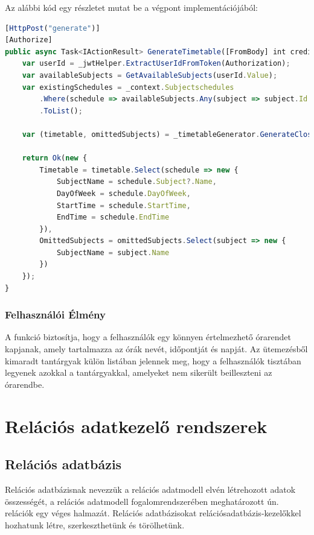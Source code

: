 \documentclass[colorlinks]{thesis-kando}
\theoremstyle{definition}
\theoremstyle{remark}
\begin{document}
Az alábbi kód egy részletet mutat be a végpont implementációjából:

\begin{lstlisting}[language=JavaScript]
[HttpPost("generate")]
[Authorize]
public async Task<IActionResult> GenerateTimetable([FromBody] int creditValue, [FromHeader(Name = "Authorization")] string Authorization) {
    var userId = _jwtHelper.ExtractUserIdFromToken(Authorization);
    var availableSubjects = GetAvailableSubjects(userId.Value);
    var existingSchedules = _context.Subjectschedules
        .Where(schedule => availableSubjects.Any(subject => subject.Id == schedule.SubjectId))
        .ToList();

    var (timetable, omittedSubjects) = _timetableGenerator.GenerateClosestTimetable(creditValue, availableSubjects, existingSchedules);

    return Ok(new {
        Timetable = timetable.Select(schedule => new {
            SubjectName = schedule.Subject?.Name,
            DayOfWeek = schedule.DayOfWeek,
            StartTime = schedule.StartTime,
            EndTime = schedule.EndTime
        }),
        OmittedSubjects = omittedSubjects.Select(subject => new {
            SubjectName = subject.Name
        })
    });
}
\end{lstlisting}

\subsection{Felhasználói Élmény}
A funkció biztosítja, hogy a felhasználók egy könnyen értelmezhető órarendet kapjanak, amely tartalmazza az órák nevét, időpontját és napját. Az ütemezésből kimaradt tantárgyak külön listában jelennek meg, hogy a felhasználók tisztában legyenek azokkal a tantárgyakkal, amelyeket nem sikerült beilleszteni az órarendbe.

\chapter{Relációs adatkezelő rendszerek}

\section{Relációs adatbázis}

	Relációs adatbázisnak nevezzük a relációs adatmodell elvén létrehozott adatok összességét, a relációs adatmodell fogalomrendszerében meghatározott ún. relációk egy véges halmazát. Relációs adatbázisokat relációsadatbázis-kezelőkkel hozhatunk létre, szerkeszthetünk és törölhetünk.
\end{document}

